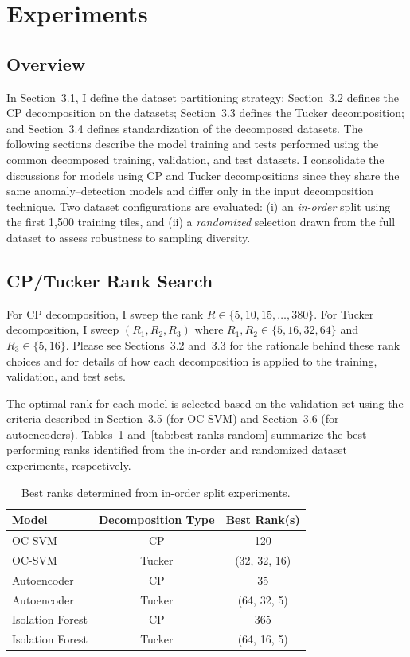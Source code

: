 \documentclass[pdflatex,sn-mathphys-ay]{sn-jnl}
\begin{document}
\section{Experiments}
\label{sec:experiments}

\subsection{Overview}
In Section~3.1, I define the dataset partitioning strategy; Section~3.2 defines the CP decomposition on the datasets; Section~3.3 defines the Tucker decomposition; and Section~3.4 defines standardization of the decomposed datasets. The following sections describe the model training and tests performed using the common decomposed training, validation, and test datasets. I consolidate the discussions for models using CP and Tucker decompositions since they share the same anomaly–detection models and differ only in the input decomposition technique. Two dataset configurations are evaluated: (i) an \textit{in-order} split using the first 1,500 training tiles, and (ii) a \textit{randomized} selection drawn from the full dataset to assess robustness to sampling diversity.

\subsection{CP/Tucker Rank Search}
For CP decomposition, I sweep the rank \(R \in \{5,10,15,\dots,380\}\).
For Tucker decomposition, I sweep \((R_1,R_2,R_3)\) where
\(R_1,R_2 \in \{5,16,32,64\}\) and \(R_3 \in \{5,16\}\).
Please see Sections~3.2 and~3.3 for the rationale behind these rank choices and for details of how each decomposition is applied to the training, validation, and test sets.

The optimal rank for each model is selected based on the validation set using the criteria described in Section~3.5 (for OC-SVM) and Section~3.6 (for autoencoders).  
Tables~\ref{tab:best-ranks-inorder} and~\ref{tab:best-ranks-random} summarize the best-performing ranks identified from the in-order and randomized dataset experiments, respectively.

\begin{table}
\centering
\caption{Best ranks determined from in-order split experiments.}
\label{tab:best-ranks-inorder}
\begin{tabular}{lcc}
\hline
\textbf{Model} & \textbf{Decomposition Type} & \textbf{Best Rank(s)} \\
\hline
OC-SVM         & CP     & 120 \\
OC-SVM         & Tucker & (32, 32, 16) \\
Autoencoder     & CP     & 35 \\
Autoencoder     & Tucker & (64, 32, 5) \\
Isolation Forest & CP     & 365 \\
Isolation Forest & Tucker & (64, 16, 5) \\
\hline
\end{tabular}
\end{table}
\end{document}
